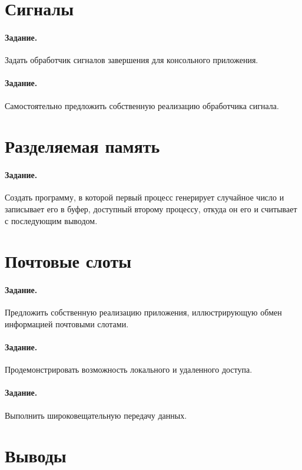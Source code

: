\section{Сигналы}

\paragraph{Задание.} Задать обработчик сигналов завершения для консольного приложения.

\paragraph{Задание.} Самостоятельно предложить собственную реализацию обработчика сигнала.

\section{Разделяемая память}

\paragraph{Задание.} Создать программу, в которой первый процесс генерирует случайное число и записывает его в буфер, доступный второму процессу, откуда он его и считывает с последующим выводом.

\section{Почтовые слоты}

\paragraph{Задание.} Предложить собственную реализацию приложения, иллюстрирующую обмен информацией почтовыми слотами.

\paragraph{Задание.} Продемонстрировать возможность локального и удаленного доступа.

\paragraph{Задание.} Выполнить широковещательную передачу данных.

\section{Выводы}

